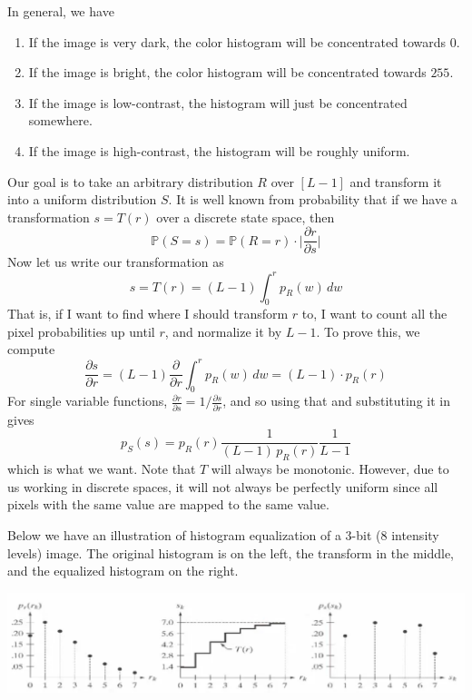 \documentclass{article}
\begin{document}
    In general, we have 
    \begin{enumerate}
        \item If the image is very dark, the color histogram will be concentrated towards $0$. 
        \item If the image is bright, the color histogram will be concentrated towards $255$. 
        \item If the image is low-contrast, the histogram will just be concentrated somewhere. 
        \item If the image is high-contrast, the histogram will be roughly uniform. 
    \end{enumerate}
    Our goal is to take an arbitrary distribution $R$ over $[L-1]$ and transform it into a uniform distribution $S$. It is well known from probability that if we have a transformation $s = T(r)$ over a discrete state space, then 
    \[\mathbb{P}(S = s) = \mathbb{P}(R = r) \cdot \bigg| \frac{\partial r}{\partial s} \bigg| \]
    Now let us write our transformation as 
    \[s = T(r) = (L - 1) \int_0^r p_R (w) \, dw\]
    That is, if I want to find where I should transform $r$ to, I want to count all the pixel probabilities up until $r$, and normalize it by $L-1$. To prove this, we compute 
    \[\frac{\partial s}{\partial r} = (L-1) \frac{\partial}{\partial r} \int_0^r p_R (w) \,dw = (L-1) \cdot p_R (r)\]
    For single variable functions, $\frac{\partial r}{\partial s} =  1/ \frac{\partial s}{\partial r}$, and so using that and substituting it in gives 
    \[p_S (s) = p_R (r) \frac{1}{(L-1) \, p_R (r)} \frac{1}{L-1}\]
    which is what we want. Note that $T$ will always be monotonic. However, due to us working in discrete spaces, it will not always be perfectly uniform since all pixels with the same value are mapped to the same value. 

    \begin{example}
    Below we have an illustration of histogram equalization of a 3-bit (8 intensity levels) image. The original histogram is on the left, the transform in the middle, and the equalized histogram on the right. 
    \begin{center}
        \includegraphics[scale=0.4]{img/hist_equalization.png}
    \end{center}
    \end{example}
\end{document}
